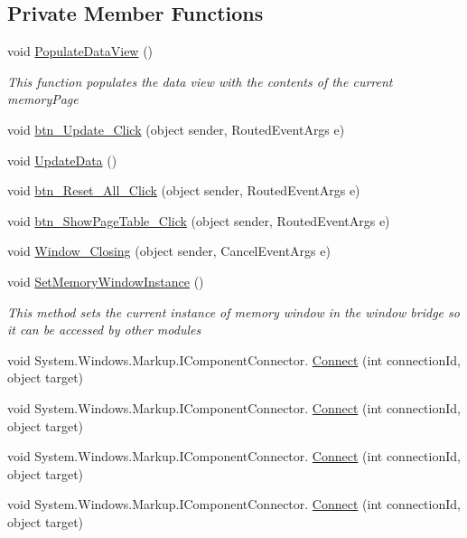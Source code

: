 \subsection*{Private Member Functions}
\begin{DoxyCompactItemize}
\item 
void \hyperlink{class_c_p_u___o_s___simulator_1_1_memory_window_a8811287064d6315e3a8c01531148ed81}{Populate\+Data\+View} ()
\begin{DoxyCompactList}\small\item\em This function populates the data view with the contents of the current memory\+Page \end{DoxyCompactList}\item 
void \hyperlink{class_c_p_u___o_s___simulator_1_1_memory_window_a91ec1c8081b85d3c07eaa31ee524f5d9}{btn\+\_\+\+Update\+\_\+\+Click} (object sender, Routed\+Event\+Args e)
\item 
void \hyperlink{class_c_p_u___o_s___simulator_1_1_memory_window_ab0cb156466262b3d90f19acd422dc65b}{Update\+Data} ()
\item 
void \hyperlink{class_c_p_u___o_s___simulator_1_1_memory_window_ac77beff86f4dd6322bdcf2430892d2aa}{btn\+\_\+\+Reset\+\_\+\+All\+\_\+\+Click} (object sender, Routed\+Event\+Args e)
\item 
void \hyperlink{class_c_p_u___o_s___simulator_1_1_memory_window_a0540a495053120e2572a106dbbc391de}{btn\+\_\+\+Show\+Page\+Table\+\_\+\+Click} (object sender, Routed\+Event\+Args e)
\item 
void \hyperlink{class_c_p_u___o_s___simulator_1_1_memory_window_a0727fbff3ea42722692b224a621ecc4a}{Window\+\_\+\+Closing} (object sender, Cancel\+Event\+Args e)
\item 
void \hyperlink{class_c_p_u___o_s___simulator_1_1_memory_window_a5100fa341de6de08d11967198cd82208}{Set\+Memory\+Window\+Instance} ()
\begin{DoxyCompactList}\small\item\em This method sets the current instance of memory window in the window bridge so it can be accessed by other modules \end{DoxyCompactList}\item 
void System.\+Windows.\+Markup.\+I\+Component\+Connector. \hyperlink{class_c_p_u___o_s___simulator_1_1_memory_window_aba65e66795c99052ebed93162110e908}{Connect} (int connection\+Id, object target)
\item 
void System.\+Windows.\+Markup.\+I\+Component\+Connector. \hyperlink{class_c_p_u___o_s___simulator_1_1_memory_window_aba65e66795c99052ebed93162110e908}{Connect} (int connection\+Id, object target)
\item 
void System.\+Windows.\+Markup.\+I\+Component\+Connector. \hyperlink{class_c_p_u___o_s___simulator_1_1_memory_window_aba65e66795c99052ebed93162110e908}{Connect} (int connection\+Id, object target)
\item 
void System.\+Windows.\+Markup.\+I\+Component\+Connector. \hyperlink{class_c_p_u___o_s___simulator_1_1_memory_window_aba65e66795c99052ebed93162110e908}{Connect} (int connection\+Id, object target)
\end{DoxyCompactItemize}
